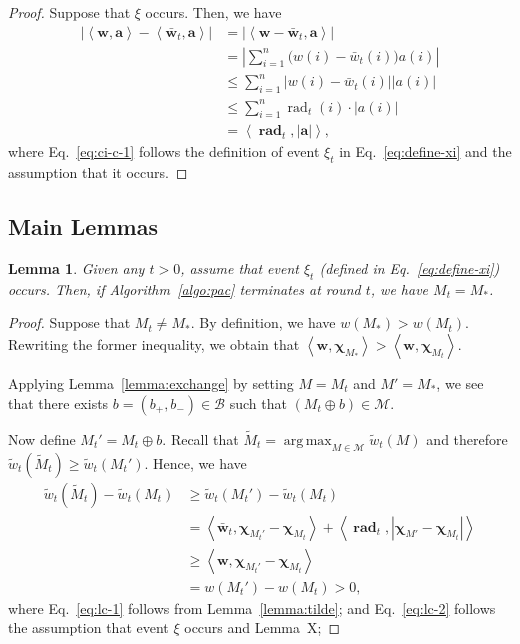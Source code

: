 \documentclass{article}
\newtheorem{lemma}{Lemma}
\newcommand{\M}{\mathcal M}
\newcommand{\B}{\mathcal B}
\DeclareMathOperator{\rad}{rad}
\DeclareMathOperator*{\argmax}{arg\,max}
\newcommand{\inn}[1]{\left\langle #1 \right\rangle}
\renewcommand{\vec}[1]{\boldsymbol{#1}}
\begin{document}
\begin{spacing}{1.1}
\begin{proof}
Suppose that $\xi$ occurs. Then, we have
\begin{align}
\big|\inn{\vec w,\vec a} - \inn{\vec {\bar w}_t, \vec a}\big| 
&=\big|\inn{\vec w-\vec {\bar w}_t,\vec a}\big| \nonumber \\
&=\left|\sum_{i=1}^n \big(w(i)-\bar w_t(i)\big) a(i)  \right| \nonumber \\
&\le\sum_{i=1}^n \big| w(i)-\bar w_t(i)\big| |a(i)| \nonumber \\
&\le\sum_{i=1}^{n} \rad_t(i) \cdot |a(i)| \label{eq:ci-c-1}\\
&= \inn{\vec \rad_t,  |\vec a|}, \nonumber
\end{align}
where Eq.~\eqref{eq:ci-c-1} follows the definition of event $\xi_t$ in Eq.~\eqref{eq:define-xi} and the assumption that it occurs.
\end{proof}


\subsection{Main Lemmas}

\begin{lemma}
\label{lemma:correct}
Given any $t > 0$, assume that event $\xi_t$ (defined in Eq.~\eqref{eq:define-xi}) occurs.
Then, if Algorithm~\ref{algo:pac} terminates at round $t$, we have $M_t=M_*$.
\end{lemma}

\begin{proof}
Suppose that $M_t \not= M_*$. 
By definition, we have $w(M_*)>w(M_t)$. 
Rewriting the former inequality, we obtain that $\inn{\vec w, \vec\chi_{M_*}} > \inn{\vec w,\vec\chi_{M_t}}$.

Applying Lemma~\ref{lemma:exchange} by setting $M=M_t$ and $M'=M_*$, we see that 
there exists $b=(b_+,b_-)\in \B$ such that $(M_t \oplus b) \in \M$.


Now define $M_t' = M_t \oplus b$.
Recall that $\tilde M_t =\argmax_{M\in \M} \tilde w_t(M)$ and therefore $\tilde w_t(\tilde M_t) \ge \tilde w_t(M_t')$.
Hence, we have
\begin{align}
  \tilde w_t(\tilde M_t)-\tilde w_t(M_t) 
  &\ge \tilde w_t(M_t')-\tilde w_t(M_t) \nonumber \\
  &= \inn{\vec {\bar w}_t, \vec \chi_{M_t'}-\vec\chi_{M_t}}+\inn{\vec \rad_t, |\vec \chi_{M'}-\vec\chi_{M_t}|} \label{eq:lc-1}\\
  &\ge \inn{\vec w, \vec \chi_{M_t'}-\vec\chi_{M_t}} \label{eq:lc-2}\\
  &= w(M_t')-w(M_t) > 0 \label{eq:lc-3},
\end{align}
where Eq.~\eqref{eq:lc-1} follows from Lemma~\ref{lemma:tilde};
and Eq.~\eqref{eq:lc-2} follows the assumption that event $\xi$ occurs and Lemma~X;


\end{proof}
\end{spacing}
\end{document}
